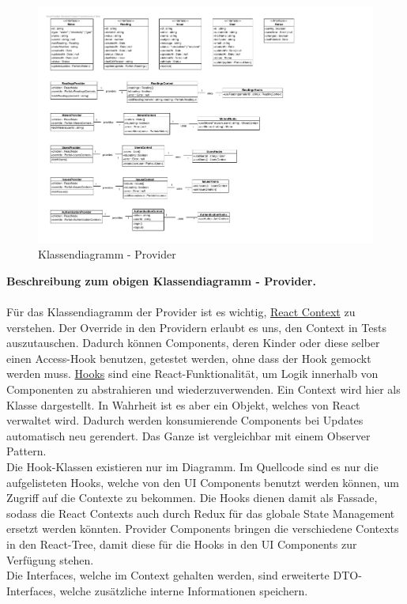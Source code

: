 \begin{figure}[H]
	\hspace{-3cm}
	\includegraphics[scale = 0.9]{./img/diagrams/providers-classDiagram}
	\caption{Klassendiagramm - Provider}
\end{figure}
\newpage

\textbf{Beschreibung zum obigen Klassendiagramm - Provider.} \\ \\
Für das Klassendiagramm der Provider ist es wichtig, \href{https://reactjs.org/docs/context.html}{React Context} zu verstehen.  Der Override in den Providern erlaubt es uns, den Context in Tests auszutauschen. Dadurch können Components, deren Kinder oder diese selber einen Access-Hook  benutzen, getestet werden, ohne dass der Hook gemockt werden muss. \href{https://reactjs.org/docs/hooks-intro.html}{Hooks} sind eine React-Funktionalität, um Logik innerhalb von Componenten zu abstrahieren und wiederzuverwenden. Ein Context wird hier als Klasse dargestellt. In Wahrheit ist es aber ein Objekt, 
welches von React verwaltet wird. Dadurch werden konsumierende Components bei Updates automatisch neu gerendert. Das Ganze ist vergleichbar mit einem Observer Pattern. \\
Die Hook-Klassen existieren nur im Diagramm. Im Quellcode sind es nur die aufgelisteten Hooks, welche von den UI Components benutzt werden können, um Zugriff auf die Contexte zu bekommen. Die Hooks dienen damit als Fassade, sodass die React Contexts auch durch Redux für das globale State Management ersetzt werden könnten.
Provider Components bringen die verschiedene Contexts in den React-Tree, damit diese für die Hooks in den UI Components zur Verfügung stehen.\\
Die Interfaces, welche im Context gehalten werden, sind erweiterte DTO-Interfaces, welche zusätzliche interne Informationen speichern.

